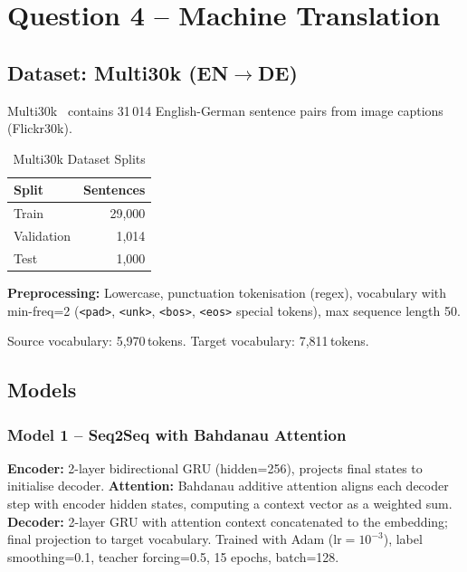 \section{Question 4 -- Machine Translation}

\subsection{Dataset: Multi30k (EN$\to$DE)}

Multi30k~\cite{elliott2016multi30k} contains 31\,014 English-German
sentence pairs from image captions (Flickr30k).

\begin{table}[H]
  \centering
  \caption{Multi30k Dataset Splits}
  \label{tab:q4_data}
  \begin{tabular}{lr}
    \toprule
    \textbf{Split} & \textbf{Sentences} \\ \midrule
    Train      & 29{,}000 \\
    Validation & 1{,}014  \\
    Test       & 1{,}000  \\
    \bottomrule
  \end{tabular}
\end{table}

\noindent\textbf{Preprocessing:} Lowercase, punctuation tokenisation (regex),
vocabulary with min-freq=2 (\texttt{<pad>}, \texttt{<unk>}, \texttt{<bos>},
\texttt{<eos>} special tokens), max sequence length 50.

Source vocabulary: 5{,}970\,tokens.
Target vocabulary: 7{,}811\,tokens.

\subsection{Models}

\subsubsection{Model 1 -- Seq2Seq with Bahdanau Attention}

\textbf{Encoder:} 2-layer bidirectional GRU (hidden=256), projects final
states to initialise decoder.
\textbf{Attention:} Bahdanau additive attention aligns each decoder step with
encoder hidden states, computing a context vector as a weighted sum.
\textbf{Decoder:} 2-layer GRU with attention context concatenated to the
embedding; final projection to target vocabulary.
Trained with Adam ($\text{lr}=10^{-3}$), label smoothing=0.1, teacher
forcing=0.5, 15 epochs, batch=128.

